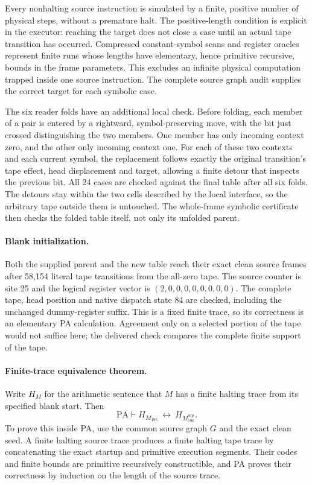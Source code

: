 Every nonhalting source instruction is simulated by a finite, positive
number of physical steps, without a premature halt. The positive-length
condition is explicit in the executor: reaching the target does not
close a case until an actual tape transition has occurred. Compressed
constant-symbol scans and register oracles represent finite runs whose
lengths have elementary, hence primitive recursive, bounds in the frame
parameters. This excludes an infinite physical computation trapped
inside one source instruction. The complete source graph audit supplies
the correct target for each symbolic case.

The six reader folds have an additional local check. Before folding, each
member of a pair is entered by a rightward, symbol-preserving move, with
the bit just crossed distinguishing the two members. One member has only
incoming context zero, and the other only incoming context one. For each
of these two contexts and each current symbol, the replacement follows
exactly the original transition's tape effect, head displacement and
target, allowing a finite detour that inspects the previous bit. All 24
cases are checked against the final table after all six folds. The
detours stay within the two cells described by the local interface, so
the arbitrary tape outside them is untouched. The whole-frame symbolic
certificate then checks the folded table itself, not only its unfolded
parent.

\paragraph{Blank initialization.}
Both the supplied parent and the new table reach their exact clean source
frames after 58,154 literal tape transitions from the all-zero tape.
The source counter is site 25 and the logical register vector is
$(2,0,0,0,0,0,0,0,0)$. The complete tape, head position and native dispatch
state 84 are checked, including the unchanged dummy-register suffix.
This is a fixed finite trace, so its correctness is an elementary PA
calculation. Agreement only on a selected portion of the tape would
not suffice here; the delivered check compares the complete finite
support of the tape.

\paragraph{Finite-trace equivalence theorem.}
Write $H_M$ for the arithmetic sentence that $M$ has a finite halting
trace from its specified blank start. Then
\[
 \mathrm{PA}\vdash
 H_{M_{195}}\ \longleftrightarrow\ H_{M_{196}^{\mathrm{sep}}}.
\tag{195-preservation}
\]
To prove this inside PA, use the common source graph $G$ and the exact
clean seed. A finite halting source trace produces a finite halting tape
trace by concatenating the exact startup and primitive execution
segments. Their codes and finite bounds are primitive recursively
constructible, and PA proves their correctness by induction on the
length of the source trace.

